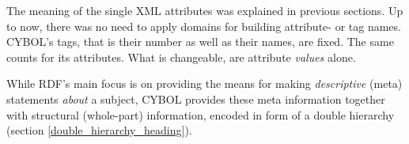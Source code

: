 The meaning of the single XML attributes was explained in previous sections. Up
to now, there was no need to apply domains for building attribute- or tag
names. CYBOL's tags, that is their number as well as their names, are fixed.
The same counts for its attributes. What is changeable, are attribute
\emph{values} alone.

While RDF's main focus is on providing the means for making \emph{descriptive}
(meta) statements \emph{about} a subject, CYBOL provides these meta information
together with structural (whole-part) information, encoded in form of a double
hierarchy (section \ref{double_hierarchy_heading}).
